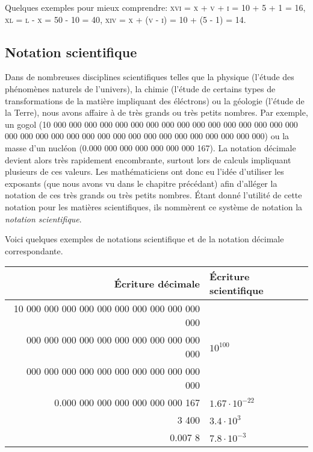 Quelques exemples pour mieux comprendre: \textsc{xvi = x + v + i = 10 + 5 + 1 = 16}, \textsc{xl = l - x = 50 - 10 = 40}, \textsc{xiv = x + (v - i) = 10 + (5 - 1) = 14}.

\subsection{Notation scientifique}

Dans de nombreuses disciplines scientifiques telles que la physique (l'étude des phénomènes naturels de l'univers), la chimie (l'étude de certains types de transformations de la matière impliquant des éléctrons) ou la géologie (l'étude de la Terre), nous avons affaire à de très grands ou très petits nombres. Par exemple, un gogol (10 000 000 000 000 000 000 000 000 000 000 000 000 000 000 000 000 000 000 000 000 000 000 000 000 000 000 000 000 000 000 000 000 000) ou la masse d'un nucléon (0.000 000 000 000 000 000 000 167). La notation décimale devient alors très rapidement encombrante, surtout lors de calculs impliquant plusieurs de ces valeurs. Les mathématiciens ont donc eu l'idée d'utiliser les exposants (que nous avons vu dans le chapitre précédant) afin d'alléger la notation de ces très grands ou très petits nombres. Étant donné l'utilité de cette notation pour les matières scientifiques, ils nommèrent ce système de notation la \emph{notation scientifique}.

Voici quelques exemples de notations scientifique et de la notation décimale correspondante.
\begin{longtable}{rl}
	\toprule
	\textbf{Écriture décimale} & \textbf{Écriture scientifique} \\ \midrule
	10 000 000 000 000 000 000 000 000 000 000 000 & \\
	000 000 000 000 000 000 000 000 000 000 000 & $10^{100}$ \\
	000 000 000 000 000 000 000 000 000 000 000 & \\ \hline
	0.000 000 000 000 000 000 000 167 & $1.67 \cdot 10^{-22}$ \\ \hline
	3 400 & $3.4 \cdot 10^3$ \\ \hline
	0.007 8 & $7.8 \cdot 10^{-3}$ \\ \bottomrule
\end{longtable}

